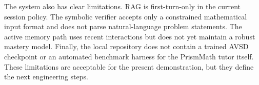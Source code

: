 The system also has clear limitations. RAG is first-turn-only in the current session policy. The symbolic verifier accepts only a constrained mathematical input format and does not parse natural-language problem statements. The active memory path uses recent interactions but does not yet maintain a robust mastery model. Finally, the local repository does not contain a trained AVSD checkpoint or an automated benchmark harness for the PrismMath tutor itself. These limitations are acceptable for the present demonstration, but they define the next engineering steps.
